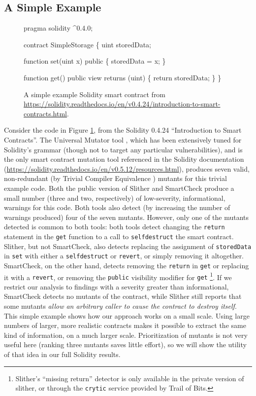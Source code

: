 \subsection{A Simple Example}

\begin{figure}
{\scriptsize
\begin{code}
pragma solidity ^0.4.0;

contract SimpleStorage \{
    uint storedData;

    function set(uint x) public \{
        storedData = x;
    \}

    function get() public view returns (uint) \{
        return storedData;
    \}
  \}
\end{code}
}
\caption{A simple example Solidity smart contract from \url{https://solidity.readthedocs.io/en/v0.4.24/introduction-to-smart-contracts.html}.}
\label{fig:sol424intro}
\end{figure}

Consider the code in Figure \ref{fig:sol424intro}, from the Solidity 0.4.24 ``Introduction to Smart Contracts''.  The Universal Mutator tool \cite{universalmutator,regexpMut}, which has been extensively tuned for Solidity's grammar (though not to target any particular vulnerabilities), and is the only smart contract mutation tool referenced in the Solidity documentation (\url{https://solidity.readthedocs.io/en/v0.5.12/resources.html}), produces seven valid, non-redundant (by Trivial Compiler Equivalence \cite{TCE}) mutants for this trivial example code.  Both the public version of Slither \cite{slither} and SmartCheck \cite{smartcheck} produce a small number (three and two, respectively) of low-severity, informational, warnings for this code.  Both tools also detect (by increasing the number of warnings produced) four of the seven mutants.  However, only one of the mutants detected is common to both tools: both tools detect changing the {\tt return} statement in the {\tt get} function to a call to {\tt selfdestruct} the smart contract.  Slither, but not SmartCheck, also detects replacing the assignment of {\tt storedData} in {\tt set} with either a {\tt selfdestruct} or {\tt revert}, or simply removing it altogether.  SmartCheck, on the other hand, detects removing the {\tt return} in {\tt get} or replacing it with a {\tt revert}, or removing the {\tt public} visibility modifier for {\tt get} \footnote{Slither's ``missing return'' detector is only available in the private version of slither, or through the {\tt crytic} service provided by Trail of Bits.}.  If we restrict our analysis to findings with a severity greater than informational, SmartCheck detects no mutants of the contract, while Slither still reports that some mutants \emph{allow an arbitrary caller to cause the contract to destroy itself}.  This simple example shows how our approach works on a small scale.  Using large numbers of larger, more realistic contracts makes it possible to extract the same kind of information, on a much larger scale.  Prioritization of mutants is not very useful here (ranking three mutants saves little effort), so we will show the utility of that idea in our full Solidity results.

